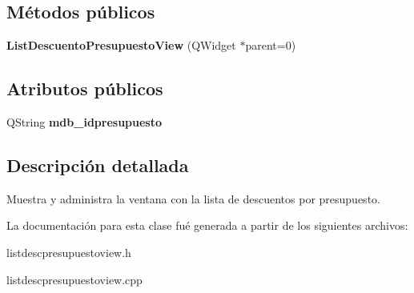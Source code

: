 \subsection*{M\'{e}todos p\'{u}blicos}
\begin{CompactItemize}
\item 
{\bf List\-Descuento\-Presupuesto\-View} (QWidget $\ast$parent=0)\label{classListDescuentoPresupuestoView_a0}

\end{CompactItemize}
\subsection*{Atributos p\'{u}blicos}
\begin{CompactItemize}
\item 
QString {\bf mdb\_\-idpresupuesto}\label{classListDescuentoPresupuestoView_o0}

\end{CompactItemize}


\subsection{Descripci\'{o}n detallada}
Muestra y administra la ventana con la lista de descuentos por presupuesto. 



La documentaci\'{o}n para esta clase fu\'{e} generada a partir de los siguientes archivos:\begin{CompactItemize}
\item 
listdescpresupuestoview.h\item 
listdescpresupuestoview.cpp\end{CompactItemize}
